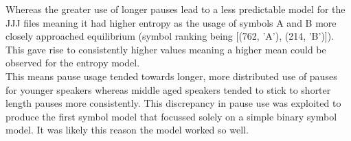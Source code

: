 Whereas the greater use of longer pauses lead to a less predictable model for the JJJ files meaning it had higher entropy as the usage of symbols A and B more closely approached equilibrium (symbol ranking being [(762, 'A'), (214, 'B')]). This gave rise to consistently higher values meaning a higher mean could be observed for the entropy model. \\ 

This means pause usage tended towards longer, more distributed use of pauses for younger speakers whereas middle aged speakers tended to stick to shorter length pauses more consistently. This discrepancy in pause use was exploited to produce the first symbol model that focussed solely on a simple binary symbol model. It was likely this reason the model worked so well. \\


%


